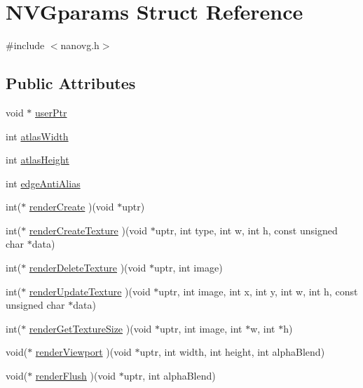 \hypertarget{struct_n_v_gparams}{\section{N\+V\+Gparams Struct Reference}
\label{struct_n_v_gparams}
}


{\ttfamily \#include $<$nanovg.\+h$>$}

\subsection*{Public Attributes}
\begin{DoxyCompactItemize}
\item 
void $\ast$ \hyperlink{struct_n_v_gparams_a6976a0363fdbfa0ef1e756556ef05f97}{user\+Ptr}
\item 
int \hyperlink{struct_n_v_gparams_a6a77310845f0d6ca24955582625fc2f3}{atlas\+Width}
\item 
int \hyperlink{struct_n_v_gparams_a835232ed4e66c1cdbd8ed74ff822dde1}{atlas\+Height}
\item 
int \hyperlink{struct_n_v_gparams_a273c8d7199cc5dc4f1a69e12f0b90229}{edge\+Anti\+Alias}
\item 
int($\ast$ \hyperlink{struct_n_v_gparams_ae62f4124bb147d342edfcbc8c233c782}{render\+Create} )(void $\ast$uptr)
\item 
int($\ast$ \hyperlink{struct_n_v_gparams_a5c15e9da1c7021d104ac0915ddf8bcdf}{render\+Create\+Texture} )(void $\ast$uptr, int type, int w, int h, const unsigned char $\ast$data)
\item 
int($\ast$ \hyperlink{struct_n_v_gparams_a165c064c1c1a454a45e2848feedd5fdd}{render\+Delete\+Texture} )(void $\ast$uptr, int image)
\item 
int($\ast$ \hyperlink{struct_n_v_gparams_ab9ece91b2fa9528d2fde0a134086f3a5}{render\+Update\+Texture} )(void $\ast$uptr, int image, int x, int y, int w, int h, const unsigned char $\ast$data)
\item 
int($\ast$ \hyperlink{struct_n_v_gparams_a2ecbd50cea119eb702cfbab7538596b8}{render\+Get\+Texture\+Size} )(void $\ast$uptr, int image, int $\ast$w, int $\ast$h)
\item 
void($\ast$ \hyperlink{struct_n_v_gparams_aa58560027660da6375360427ad5271e2}{render\+Viewport} )(void $\ast$uptr, int width, int height, int alpha\+Blend)
\item 
void($\ast$ \hyperlink{struct_n_v_gparams_a5c2b79e8bf66c15b1f265c39cb4f277c}{render\+Flush} )(void $\ast$uptr, int alpha\+Blend)
\item 

\end{DoxyCompactItemize}
